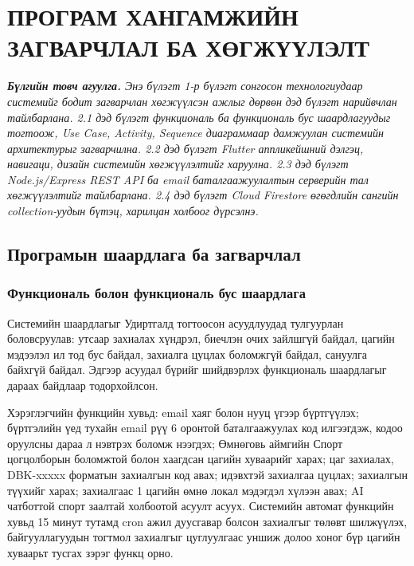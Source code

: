 
\chapter{ПРОГРАМ ХАНГАМЖИЙН ЗАГВАРЧЛАЛ БА ХӨГЖҮҮЛЭЛТ}
\label{Chapter3}
\pagecolor{white}

\noindent\textit{\textbf{Бүлгийн товч агуулга.} Энэ бүлэгт 1-р бүлэгт сонгосон технологиудаар системийг бодит загварчлан хөгжүүлсэн ажлыг дөрвөн дэд бүлэгт нарийвчлан тайлбарлана. 2.1 дэд бүлэгт функциональ ба функциональ бус шаардлагуудыг тогтоож, Use Case, Activity, Sequence диаграммаар дамжуулан системийн архитектурыг загварчилна. 2.2 дэд бүлэгт Flutter аппликейшний дэлгэц, навигаци, дизайн системийн хөгжүүлэлтийг харуулна. 2.3 дэд бүлэгт Node.js/Express REST API ба email баталгаажуулалтын серверийн тал хөгжүүлэлтийг тайлбарлана. 2.4 дэд бүлэгт Cloud Firestore өгөгдлийн сангийн collection-уудын бүтэц, харилцан холбоог дүрсэлнэ.}

\bigskip


\section{Програмын шаардлага ба загварчлал}

\subsection*{Функциональ болон функциональ бус шаардлага}

Системийн шаардлагыг Удиртгалд тогтоосон асуудлуудад тулгуурлан боловсруулав: утсаар захиалах хүндрэл, биечлэн очих зайлшгүй байдал, цагийн мэдээлэл ил тод бус байдал, захиалга цуцлах боломжгүй байдал, сануулга байхгүй байдал. Эдгээр асуудал бүрийг шийдвэрлэх функциональ шаардлагыг дараах байдлаар тодорхойлсон.

Хэрэглэгчийн функцийн хувьд: email хаяг болон нууц үгээр бүртгүүлэх; бүртгэлийн үед тухайн email рүү 6 оронтой баталгаажуулах код илгээгдэж, кодоо оруулсны дараа л нэвтрэх боломж нээгдэх; Өмнөговь аймгийн Спорт цогцолборын боломжтой болон хаагдсан цагийн хуваарийг харах; цаг захиалах, DBK-xxxxx форматын захиалгын код авах; идэвхтэй захиалгаа цуцлах; захиалгын түүхийг харах; захиалгаас 1 цагийн өмнө локал мэдэгдэл хүлээн авах; AI чатботтой спорт заалтай холбоотой асуулт асуух. Системийн автомат функцийн хувьд 15 минут тутамд cron ажил дуусгавар болсон захиалгыг  төлөвт шилжүүлэх, байгууллагуудын тогтмол захиалгыг  цуглуулгаас уншиж долоо хоног бүр цагийн хуваарьт тусгах зэрэг функц орно.

